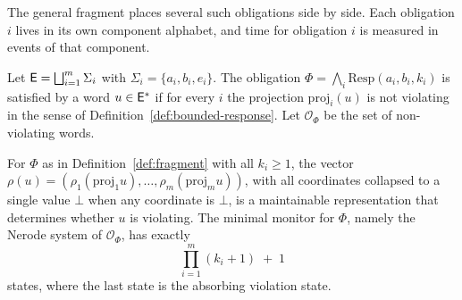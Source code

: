 The general fragment places several such obligations side by side. Each obligation $i$ lives in its own component alphabet, and time for obligation $i$ is measured in events of that component.

\begin{definition}\label{def:fragment}
Let $\mathsf{E}=\bigsqcup_{i=1}^{m}\Sigma_i$ with $\Sigma_i=\{a_i,b_i,e_i\}$. The obligation $\Phi=\bigwedge_i\mathrm{Resp}(a_i,b_i,k_i)$ is satisfied by a word $u\in\mathsf{E}^{*}$ if for every $i$ the projection $\mathrm{proj}_i(u)$ is not violating in the sense of Definition~\ref{def:bounded-response}. Let $\mathcal O_\Phi$ be the set of non-violating words.
\end{definition}

\begin{newresult}\label{thm:monitor}
For $\Phi$ as in Definition~\ref{def:fragment} with all $k_i\ge1$, the vector $\rho(u)=(\rho_1(\mathrm{proj}_1u),\dots,\rho_m(\mathrm{proj}_m u))$, with all coordinates collapsed to a single value $\bot$ when any coordinate is $\bot$, is a maintainable representation that determines whether $u$ is violating. The minimal monitor for $\Phi$, namely the Nerode system of $\mathcal O_\Phi$, has exactly
\[
\prod_{i=1}^{m}(k_i+1)\;+\;1
\]
states, where the last state is the absorbing violation state.
\end{newresult}
